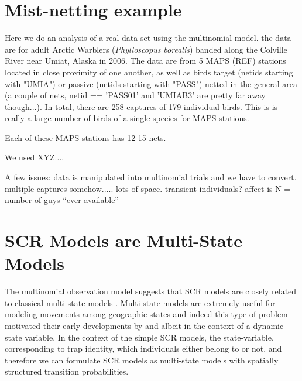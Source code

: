 \section{Mist-netting example}

Here we do an analysis of a real data set using the multinomial model.
the data are for adult Arctic Warblers ({\it Phylloscopus borealis})
banded along the Colville River near Umiat, Alaska in 2006. The data
are from 5 MAPS (REF) stations located in close proximity of one
another, as well as birds target (netids starting with "UMIA") or
passive (netids starting with "PASS") netted in the general area (a
couple of nets, netid == 'PASS01' and 'UMIAB3' are pretty far away
though...). In total, there are 258 captures of 179 individual
birds. This is is really a large number of birds of a single species
for MAPS stations.
 
Each of these MAPS stations has 12-15 nets.

We used XYZ....
 
A few issues:
 data is manipulated into multinomial trials and we have to convert.
 multiple captures somehow.....
 lots of space.
 transient individuals?  affect is N = number of guys ``ever available''
 


\section{SCR Models are Multi-State Models}

The multinomial observation model 
suggests that SCR models are closely related to 
classical multi-state models \citep[][Chapt. 9]{kery_schaub:2011}.
Multi-state models are extremely useful for modeling movements among
geographic states and indeed this type of problem motivated their
early developments by \citet{arnason:1972,arnason:1973} and
\citet{hestbeck_etal:1991} albeit in the context of a dynamic state
variable.  In the context of the simple SCR models, the
state-variable, corresponding to trap identity, which individuals
either belong to or not, and therefore we can formulate SCR models as
multi-state models with spatially structured transition probabilities.

